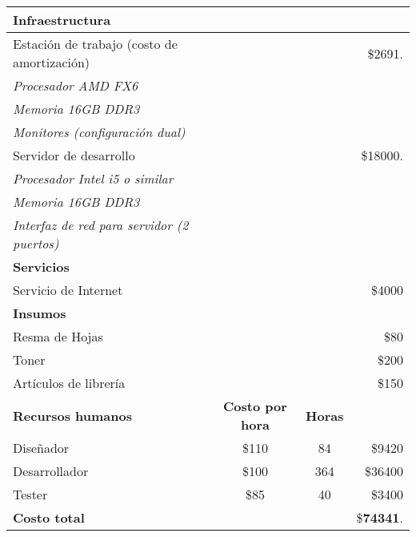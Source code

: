 \begin{center}

	\begin{tabular}{l c c r}
		\hline \hline
		
		\textbf{Infraestructura} & & & \\ \hline
		Estación de trabajo (costo de amortización)& & & \$2691. \\
		\textit{Procesador AMD FX6} & & &\\
		\textit{Memoria 16GB DDR3} & & & \\
		\textit{Monitores (configuración dual)} & & & \\
		\hline
		Servidor de desarrollo & & & \$18000. \\
		\textit{Procesador Intel i5 o similar} & & & \\
		\textit{Memoria 16GB DDR3} & & & \\
		\textit{Interfaz de red para servidor (2 puertos)} & & & \\
		\hline \hline
		
		\textbf{Servicios} & & &\\ \hline
		Servicio de Internet & & & \$4000 \\
		\hline \hline
		\textbf{Insumos} & & &\\ \hline
		Resma de Hojas & & & \$80 \\
		Toner & & & \$200 \\
		Artículos de librería & & & \$150 \\
		\hline \hline
		\textbf{Recursos humanos} & \textbf{Costo por hora} & \textbf{Horas} \\
		Diseñador & \$110 & 84 & \$9420 \\
		Desarrollador & \$100 & 364 & \$36400 \\
		Tester & \$85 & 40 & \$3400 \\
		\hline \hline
		\textbf{Costo total} & & & \$\textbf{74341}.
	\end{tabular}
\end{center}



